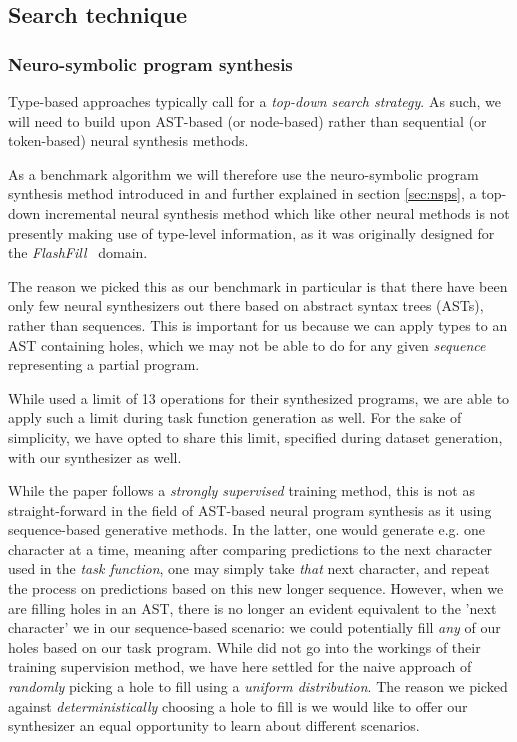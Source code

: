 \documentclass{article}
\begin{document}
\subsection{Search technique}

\subsubsection{Neuro-symbolic program synthesis}

Type-based approaches typically call for a \emph{top-down search strategy}.
As such, we will need to build upon AST-based (or node-based) rather than sequential (or token-based) neural synthesis methods.

As a benchmark algorithm we will therefore use the neuro-symbolic program synthesis method introduced in \citet{nsps} and further explained in section \ref{sec:nsps},
a top-down incremental neural synthesis method which like other neural methods is not presently making use of type-level information,
as it was originally designed for the \emph{FlashFill}~\citep{prose} domain.

The reason we picked this as our benchmark in particular is that there have been only few neural synthesizers out there based on abstract syntax trees (ASTs), rather than sequences.
This is important for us because we can apply types to an AST containing holes,
which we may not be able to do for any given \emph{sequence} representing a partial program.

While \citet{nsps} used a limit of 13 operations for their synthesized programs,
we are able to apply such a limit during task function generation as well.
For the sake of simplicity, we have opted to share this limit,
specified during dataset generation,
with our synthesizer as well.

While the paper follows a \emph{strongly supervised} training method,
this is not as straight-forward in the field of AST-based neural program synthesis as it using sequence-based generative methods.
In the latter, one would generate e.g. one character at a time,
meaning after comparing predictions to the next character used in the \emph{task function},
one may simply take \emph{that} next character,
and repeat the process on predictions based on this new longer sequence.
However, when we are filling holes in an AST,
there is no longer an evident equivalent to the 'next character' we in our sequence-based scenario:
we could potentially fill \emph{any} of our holes based on our task program.
While \citet{nsps} did not go into the workings of their training supervision method,
we have here settled for the naive approach of \emph{randomly} picking a hole to fill using a \emph{uniform distribution}.
The reason we picked against \emph{deterministically} choosing a hole to fill is
we would like to offer our synthesizer an equal opportunity to learn about different scenarios.
\end{document}
